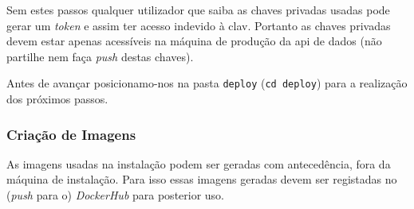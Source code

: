 Sem estes passos qualquer utilizador que saiba as chaves privadas usadas pode gerar um \textit{token} e assim ter acesso indevido à \acrshort{clav}. Portanto as chaves privadas devem estar apenas acessíveis na máquina de produção da \acrshort{api} de dados (não partilhe nem faça \textit{push} destas chaves).

Antes de avançar posicionamo-nos na pasta \texttt{deploy} (\verb|cd deploy|) para a realização dos próximos passos.

\subsubsection{Criação de Imagens}\label{sec:int-imagens}

As imagens usadas na instalação podem ser geradas com antecedência, fora da máquina de instalação. Para isso essas imagens geradas devem ser registadas no (\textit{push} para o) \textit{DockerHub} para posterior uso.

